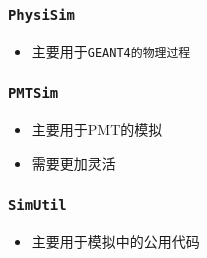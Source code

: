\begin{frame}
    \frametitle{\tt{PhysiSim}}
    \begin{itemize}    
        \item 主要用于\tt{GEANT4}的物理过程
    \end{itemize}
\end{frame}

\begin{frame}
    \frametitle{\tt{PMTSim}}
    \begin{itemize}    
        \item 主要用于PMT的模拟
        \item 需要更加灵活
    \end{itemize}
\end{frame}

\begin{frame}
    \frametitle{\tt{SimUtil}}
    \begin{itemize}    
        \item 主要用于模拟中的公用代码
    \end{itemize}
\end{frame}
